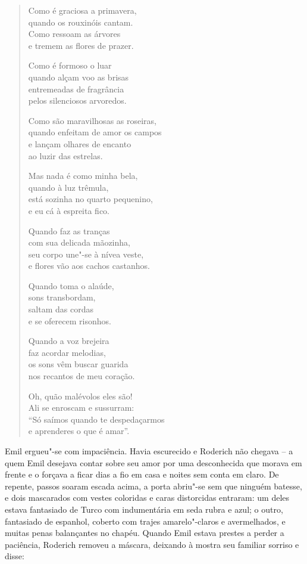 \begin{verse}
Como é graciosa a primavera,\\
quando os rouxinóis cantam.\\
Como ressoam as árvores\\
e tremem as flores de prazer. 

Como é formoso o luar\\
quando alçam voo as brisas\\
entremeadas de fragrância\\
pelos silenciosos arvoredos.

Como são maravilhosas as roseiras,\\
quando enfeitam de amor os campos\\
e lançam olhares de encanto\\
ao luzir das estrelas.

Mas nada é como minha bela,\\
quando à luz trêmula,\\
está sozinha no quarto pequenino,\\
e eu cá à espreita fico.

Quando faz as tranças\\
com sua delicada mãozinha,\\
seu corpo une"-se à nívea veste,\\
e flores vão aos cachos castanhos.

Quando toma o alaúde,\\
sons transbordam,\\
saltam das cordas\\
e se oferecem risonhos.

Quando a voz brejeira\\
faz acordar melodias,\\
os sons vêm buscar guarida\\
nos recantos de meu coração.

Oh, quão malévolos eles são!\\
Ali se enroscam e sussurram:\\
``Só saímos quando te despedaçarmos\\
e aprenderes o que é amar''.
\end{verse}


Emil ergueu"-se com impaciência. Havia escurecido e Roderich não chegava
-- a quem Emil desejava contar sobre seu amor por uma desconhecida
que morava em frente e o forçava a ficar dias a fio em casa e noites
sem conta em claro. De repente, passos soaram escada acima, a porta
abriu"-se sem que ninguém batesse, e dois mascarados com vestes
coloridas e caras distorcidas entraram: um deles estava fantasiado de
Turco com indumentária em seda rubra e azul; o outro, fantasiado de
espanhol, coberto com trajes amarelo"-claros e avermelhados, e muitas
penas balançantes no chapéu. Quando Emil estava prestes a perder a
paciência, Roderich removeu a máscara, deixando à mostra seu familiar
sorriso e disse:


